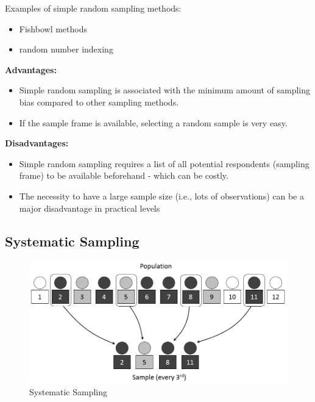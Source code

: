 \documentclass[
]{book}
\providecommand{\tightlist}{%
  \setlength{\itemsep}{0pt}\setlength{\parskip}{0pt}}
\begin{document}
Examples of simple random sampling methods:

\begin{itemize}
\tightlist
\item
  Fishbowl methods
\item
  random number indexing
\end{itemize}

\textbf{Advantages:}

\begin{itemize}
\item
  Simple random sampling is associated with the minimum amount of sampling bias compared to other sampling methods.
\item
  If the sample frame is available, selecting a random sample is very easy.
\end{itemize}

\textbf{Disadvantages:}

\begin{itemize}
\item
  Simple random sampling requires a list of all potential respondents (sampling frame) to be available beforehand - which can be costly.
\item
  The necessity to have a large sample size (i.e., lots of observations) can be a major disadvantage in practical levels
\end{itemize}

\hypertarget{systematic-sampling}{%
\subsection{Systematic Sampling}\label{systematic-sampling}}

\begin{figure}

{\centering \includegraphics[width=0.7\linewidth]{images/Systematic} 

}

\caption{Systematic Sampling}\label{fig:unnamed-chunk-24}
\end{figure}
\end{document}
